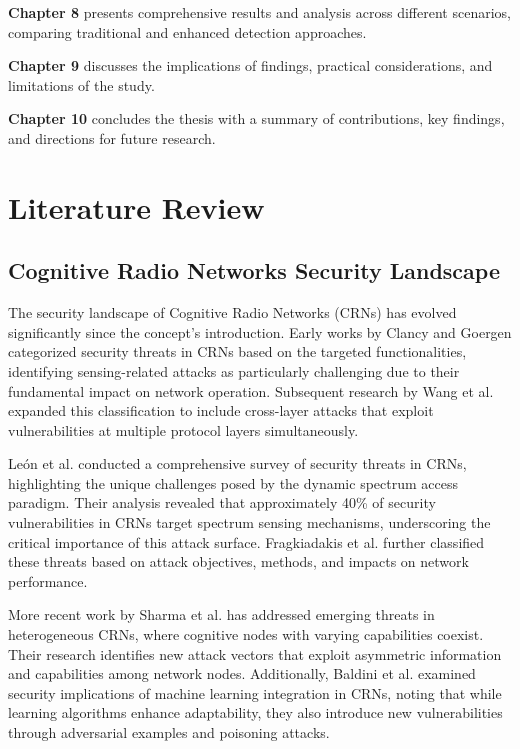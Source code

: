 \textbf{Chapter 8} presents comprehensive results and analysis across different scenarios, comparing traditional and enhanced detection approaches.

\textbf{Chapter 9} discusses the implications of findings, practical considerations, and limitations of the study.

\textbf{Chapter 10} concludes the thesis with a summary of contributions, key findings, and directions for future research.

\chapter{Literature Review}

\section{Cognitive Radio Networks Security Landscape}

The security landscape of Cognitive Radio Networks (CRNs) has evolved significantly since the concept's introduction. Early works by Clancy and Goergen \cite{clancy2008security} categorized security threats in CRNs based on the targeted functionalities, identifying sensing-related attacks as particularly challenging due to their fundamental impact on network operation. Subsequent research by Wang et al. \cite{wang2010security} expanded this classification to include cross-layer attacks that exploit vulnerabilities at multiple protocol layers simultaneously.

León et al. \cite{leon2012security} conducted a comprehensive survey of security threats in CRNs, highlighting the unique challenges posed by the dynamic spectrum access paradigm. Their analysis revealed that approximately 40\% of security vulnerabilities in CRNs target spectrum sensing mechanisms, underscoring the critical importance of this attack surface. Fragkiadakis et al. \cite{fragkiadakis2013survey} further classified these threats based on attack objectives, methods, and impacts on network performance.

More recent work by Sharma et al. \cite{sharma2015security} has addressed emerging threats in heterogeneous CRNs, where cognitive nodes with varying capabilities coexist. Their research identifies new attack vectors that exploit asymmetric information and capabilities among network nodes. Additionally, Baldini et al. \cite{baldini2017security} examined security implications of machine learning integration in CRNs, noting that while learning algorithms enhance adaptability, they also introduce new vulnerabilities through adversarial examples and poisoning attacks.

